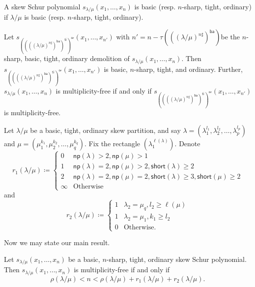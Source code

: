 \documentclass[ALCO,ThmDefs,Unicode,epreuves]{cedram}
\newcommand{\np}{\mathsf{np}}
\newcommand{\ba}{\mathsf{ba}}
\newcommand{\ti}{\mathsf{ti}}
\newcommand{\orsf}{\mathsf{or}}
\newcommand{\short}{\mathsf{short}}
\begin{document}
\begin{defi}
A skew Schur polynomial $s_{\lambda / \mu}(x_1,\ldots,x_n)$ is basic (resp. $n$-sharp, tight, ordinary) if $\lambda / \mu$ is basic (resp. $n$-sharp, tight, ordinary). 
\end{defi}


\begin{theorem} 
\label{theorem:mainReduction}
Let $s_{((((\lambda / \mu)^{n\sharp})^{\ba })^{\ti })^{\orsf}}(x_1,\ldots,x_{n'})$ with $n' = n - \tau(((\lambda / \mu)^{n\sharp})^{\ba })$\break be the $n$-sharp, basic, tight, ordinary demolition of $s_{\lambda / \mu}(x_1,\ldots,x_n)$. Then\break $s_{((((\lambda / \mu)^{n\sharp})^{\ba })^{\ti })^{\orsf}}(x_1,\ldots,x_{n'})$ is basic, $n$-sharp, tight, and ordinary. Further,\break 
$s_{\lambda / \mu}(x_1,\ldots,x_n)$ is multiplicity-free if and only if $s_{((((\lambda / \mu)^{n\sharp})^{\ba })^{\ti })^{\orsf}}(x_1,\ldots,x_{n'})$ is multiplicity-free.
\end{theorem}

\begin{defi}
\label{def:r1andr2}
Let $\lambda/\mu$ be a basic, tight, ordinary skew partition, and say $\lambda = (\lambda_1^{l_1},\lambda_2^{l_2},\ldots,\lambda_p^{l_p})$ and $\mu = (\mu_1^{k_1},\mu_2^{k_2},\ldots,\mu_q^{k_q})$. Fix the rectangle $(\lambda_1^{\ell(\lambda)})$. Denote
\begin{equation}
r_1(\lambda/\mu) \coloneqq \begin{cases}
0 & \np (\lambda)>2, \np (\mu)> 1\\
1 & \np (\lambda)=2, \np (\mu)>2, \short (\lambda)\geq 2\\
2 & \np (\lambda)=2, \np (\mu)=2, \short (\lambda)\geq 3, \short (\mu)\geq 2\\
\infty & \text{Otherwise}
\end{cases}
\end{equation}
and
\begin{equation}
r_2(\lambda/\mu) \coloneqq \begin{cases}
1 & \lambda_2 = \mu_q, l_2 \geq \ell(\mu)\\
1 & \lambda_2 = \mu_1, k_1 \geq l_2\\
0 & \text{Otherwise}.
\end{cases}
\end{equation}
\end{defi}

Now we may state our main result.

\begin{theorem}
\label{theorem:mainResult}
Let $s_{\lambda / \mu}(x_1,\ldots,x_n)$ be a basic, $n$-sharp, tight, ordinary skew Schur polynomial. Then $s_{\lambda / \mu}(x_1,\ldots,x_n)$ is multiplicity-free if and only if
\begin{equation}
\rho(\lambda/\mu) < n < \rho(\lambda/\mu) + r_1(\lambda/\mu)+ r_2(\lambda/\mu).
\end{equation}
\end{theorem}
\end{document}
